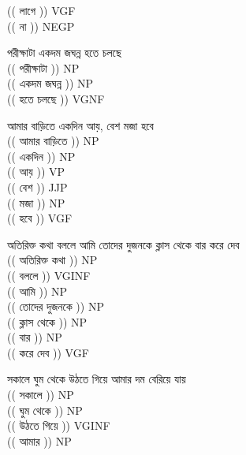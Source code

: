\documentclass[11pt,a4paper]{article}
\begin{document}
\begin{enumerate}
{		\textcolor{diff}{(( লাগে ))} VGF\\
		\textcolor{diff}{(( না ))} NEGP\\
$ $\\
		\item পরীক্ষাটা একদম জঘন্ন হতে চলছে  \\
		$ $\\
		\textcolor{diff}{(( পরীক্ষাটা ))} NP\\
		\textcolor{diff}{(( একদম জঘন্ন ))} NP\\
		\textcolor{diff}{(( হতে চলছে ))} VGNF\\
$ $\\		
		\item আমার বাড়িতে একদিন আয়, বেশ মজা হবে  \\
		$ $\\
		\textcolor{diff}{(( আমার বাড়িতে ))} NP\\
		\textcolor{diff}{(( একদিন ))} NP\\
		\textcolor{diff}{(( আয় ))} VP\\
		\textcolor{diff}{(( বেশ ))} JJP\\
		\textcolor{diff}{(( মজা ))} NP\\
		\textcolor{diff}{(( হবে ))} VGF\\
$ $\\
		\item অতিরিক্ত কথা বললে আমি তোদের দুজনকে ক্লাস থেকে বার করে দেব\\
		$ $\\
		\textcolor{diff}{(( অতিরিক্ত কথা ))} NP\\		
		\textcolor{diff}{(( বললে ))} VGINF\\		
		\textcolor{diff}{(( আমি ))} NP\\		
		\textcolor{diff}{(( তোদের দুজনকে ))} NP\\		
		\textcolor{diff}{(( ক্লাস থেকে ))} NP\\		
		\textcolor{diff}{(( বার ))} NP\\		
		\textcolor{diff}{(( করে দেব ))} VGF\\
$ $\\		
		\item সকালে ঘুম থেকে উঠতে গিয়ে আমার দম বেরিয়ে যায় \\
		$ $\\
		\textcolor{diff}{(( সকালে ))} NP\\		
		\textcolor{diff}{(( ঘুম থেকে ))} NP\\		
		\textcolor{diff}{(( উঠতে গিয়ে ))} VGINF\\		
		\textcolor{diff}{(( আমার ))} NP\\		
}
\end{enumerate}
\end{document}
